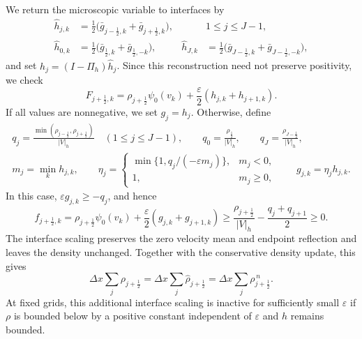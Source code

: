 \documentclass[11pt,twoside]{article}
\numberwithin{equation}{section}
\theoremstyle{plain}
\theoremstyle{nonumberplain}
\begin{document}
We return the microscopic variable to interfaces by
\[
\begin{aligned}
\widehat h_{j,k}
 &=\tfrac12\bigl(\bar g_{j-\frac12,k}+\bar g_{j+\frac12,k}\bigr),
 &&1\le j\le J-1,\\
\widehat h_{0,k}
 &=\tfrac12\bigl(\bar g_{\frac12,k}+\bar g_{\frac12,-k}\bigr),&
\widehat h_{J,k}
 &=\tfrac12\bigl(\bar g_{J-\frac12,k}+\bar g_{J-\frac12,-k}\bigr),
\end{aligned}
\]
and set $h_j=(I-\Pi_h)\widehat h_j$.
Since this reconstruction need not preserve positivity, we check
\[
F_{j+\frac12,k}
=\rho_{j+\frac12}\psi_0(v_k)
+\frac{\varepsilon}{2}(h_{j,k}+h_{j+1,k}).
\]
If all values are nonnegative, we set $g_j=h_j$.
Otherwise, define
\[
\begin{gathered}
q_j=\frac{\min(\rho_{j-\frac12},\rho_{j+\frac12})}{|V|_h}
\quad(1\le j\le J-1),\qquad
q_0=\frac{\rho_{\frac12}}{|V|_h},\qquad
q_J=\frac{\rho_{J-\frac12}}{|V|_h},\\
m_j=\min_k h_{j,k},\qquad
\eta_j=
\begin{cases}
\min\{1,q_j/(-\varepsilon m_j)\},&m_j<0,\\
1,&m_j\ge0,
\end{cases}
\qquad g_{j,k}=\eta_j h_{j,k}.
\end{gathered}
\]
In this case, $\varepsilon g_{j,k}\ge-q_j$, and hence
\[
f_{j+\frac12,k}
=\rho_{j+\frac12}\psi_0(v_k)
+\frac{\varepsilon}{2}(g_{j,k}+g_{j+1,k})
\ge\frac{\rho_{j+\frac12}}{|V|_h}
-\frac{q_j+q_{j+1}}{2}\ge0.
\]
The interface scaling preserves the zero velocity mean and endpoint
reflection and leaves the density unchanged.
Together with the conservative density update, this gives
\[
\Delta x\sum_j\rho_{j+\frac12}
=\Delta x\sum_j\widehat\rho_{j+\frac12}
=\Delta x\sum_j\rho_{j+\frac12}^{\,n}.
\]
At fixed grids, this additional interface scaling is inactive for
sufficiently small $\varepsilon$ if $\rho$ is bounded below by a positive
constant independent of $\varepsilon$ and $h$ remains bounded.



\end{document}
